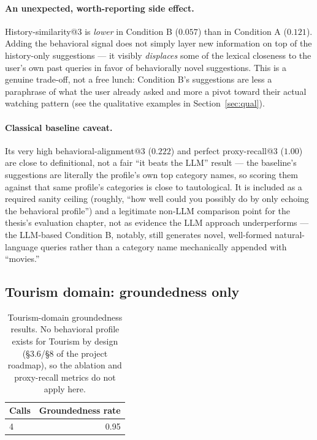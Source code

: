\documentclass[11pt,a4paper]{article}
\begin{document}
\paragraph{An unexpected, worth-reporting side effect.} History-similarity@3 is \emph{lower} in
Condition B ($0.057$) than in Condition A ($0.121$). Adding the behavioral signal does not simply
layer new information on top of the history-only suggestions --- it visibly \emph{displaces} some
of the lexical closeness to the user's own past queries in favor of behaviorally novel suggestions.
This is a genuine trade-off, not a free lunch: Condition B's suggestions are less a paraphrase of
what the user already asked and more a pivot toward their actual watching pattern (see the
qualitative examples in Section~\ref{sec:qual}).

\paragraph{Classical baseline caveat.} Its very high behavioral-alignment@3 ($0.222$) and perfect
proxy-recall@3 ($1.00$) are close to definitional, not a fair ``it beats the LLM'' result --- the
baseline's suggestions are literally the profile's own top category names, so scoring them against
that same profile's categories is close to tautological. It is included as a required sanity
ceiling (roughly, ``how well could you possibly do by only echoing the behavioral profile'') and a
legitimate non-LLM comparison point for the thesis's evaluation chapter, not as evidence the LLM
approach underperforms --- the LLM-based Condition B, notably, still generates novel, well-formed
natural-language queries rather than a category name mechanically appended with ``movies.''

\subsection{Tourism domain: groundedness only}

\begin{table}[H]
\centering
\begin{tabular}{lr}
\toprule
\textbf{Calls} & \textbf{Groundedness rate} \\
\midrule
4 & 0.95 \\
\bottomrule
\end{tabular}
\caption{Tourism-domain groundedness results. No behavioral profile exists for Tourism by design
(\S3.6/\S8 of the project roadmap), so the ablation and proxy-recall metrics do not apply here.}
\label{tab:tourism}
\end{table}
\end{document}
